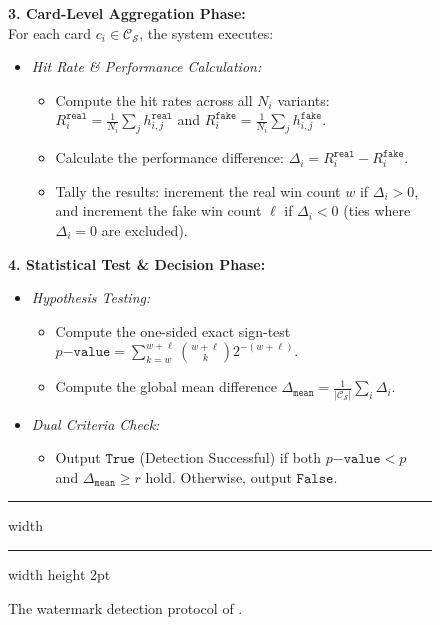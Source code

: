 \begin{figure}[!t]
\noindent \textbf{3. Card-Level Aggregation Phase:} \\
For each card $c_i \in \mathcal{C}_{\mathcal{S}}$, the system executes:
\begin{itemize}
    \item \textit{Hit Rate \& Performance Calculation:}
    \begin{itemize}
        \item Compute the hit rates across all $N_i$ variants: $R_i^{\mathtt{real}} = \frac{1}{N_i} \sum_{j} h_{i,j}^{\mathtt{real}}$ and $R_i^{\mathtt{fake}} = \frac{1}{N_i} \sum_{j} h_{i,j}^{\mathtt{fake}}$.
        \item Calculate the performance difference: $\Delta_i = R_i^{\mathtt{real}} - R_i^{\mathtt{fake}}$.
        \item Tally the results: increment the real win count $w$ if $\Delta_i > 0$, and increment the fake win count $\ell$ if $\Delta_i < 0$ (ties where $\Delta_i = 0$ are excluded).
    \end{itemize}
\end{itemize}

\noindent \textbf{4. Statistical Test \& Decision Phase:} 
\begin{itemize}
    \item \textit{Hypothesis Testing:}
    \begin{itemize}
        \item Compute the one-sided exact sign-test $p\mathtt{-value} = \sum_{k=w}^{w+\ell}\binom{w+\ell}{k}2^{-(w+\ell)}$.
        \item Compute the global mean difference $\Delta_{\mathtt{mean}} = \frac{1}{|\mathcal{C}_{\mathcal{S}}|} \sum_{i} \Delta_i$.
    \end{itemize}
    
    \item \textit{Dual Criteria Check:}
    \begin{itemize}
        \item Output $\mathtt{True}$ (Detection Successful) if both $p\mathtt{-value} < p$ and $\Delta_{\mathtt{mean}} \ge r$ hold. Otherwise, output $\mathtt{False}$.
    \end{itemize}
\end{itemize}

\hrule width \hsize \kern 1mm \hrule width \hsize height 2pt 
\caption{The watermark detection protocol of \name{}.}
\label{fig:watermark_detection_protocol}
\end{figure}

